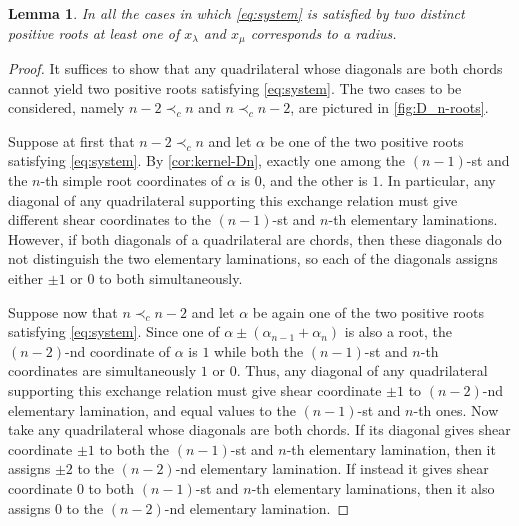 \documentclass[11pt]{amsart}
\newtheorem{lemma}[theorem]{Lemma}
\theoremstyle{definition}
\numberwithin{equation}{section}
\numberwithin{figure}{section}
\begin{document}
  \begin{lemma}
    \label{lem:is-radius}
    In all the cases in which \cref{eq:system} is satisfied by two distinct positive roots at least one of $x_\lambda$ and $x_\mu$ corresponds to a radius.
  \end{lemma}
  \begin{proof}
    It suffices to show that any quadrilateral whose diagonals are both chords cannot yield two positive roots satisfying \cref{eq:system}. 
    The two cases to be considered, namely $n-2 \prec_c n$ and  $n \prec_c n-2$,\say[PT]{} are pictured in \cref{fig:D_n-roots}. 

    Suppose at first that $n-2 \prec_c n$ and let $\alpha$ be one of the two positive roots satisfying \cref{eq:system}.
    By \cref{cor:kernel-Dn}, exactly one among the $(n-1)$-st and the $n$-th simple root coordinates of $\alpha$ is $0$, and the other is $1$.
    In particular, any diagonal of\say[PT]{} any quadrilateral supporting this exchange relation must give different shear coordinates to the $(n-1)$-st and $n$-th elementary laminations. However, if both diagonals of a quadrilateral are chords, then these diagonals do not distinguish the two elementary laminations, so each of the diagonals assigns either $\pm 1$ \say[PT]or $0$ to both simultaneously.

    Suppose now that $n \prec_c n-2$ and let $\alpha$ be again one of the two positive roots satisfying \cref{eq:system}.
    Since one of $\alpha\pm(\alpha_{n-1}+\alpha_n)$ is also a root, the $(n-2)$-nd coordinate of $\alpha$ is $1$ while both the $(n-1)$-st and $n$-th coordinates are simultaneously $1$ or $0$. Thus, any diagonal of any quadrilateral supporting this exchange relation must  give shear coordinate $\pm 1$ to $(n-2)$-nd elementary lamination, and equal values to the $(n-1)$-st and $n$-th ones. Now take any quadrilateral whose diagonals are both chords. If its diagonal gives shear coordinate $\pm 1$ to both the $(n-1)$-st and $n$-th elementary lamination, then it assigns $\pm 2$ to the $(n-2)$-nd elementary lamination.\say[PT]{}
    If instead it gives shear coordinate $0$ to both $(n-1)$-st and $n$-th elementary laminations, then it also assigns $0$ to the $(n-2)$-nd elementary lamination.
  \end{proof}
\end{document}
